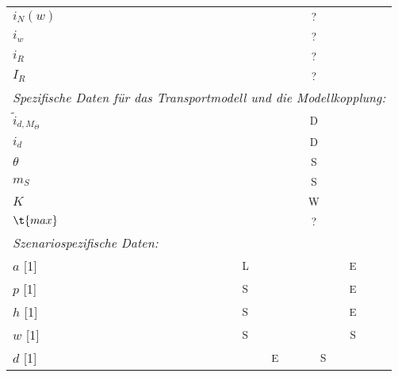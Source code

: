 \begin{longtable}{p{4cm} |p{} |p{} |p{} }
    $i_N(w)$ &\multicolumn{3}{c}{ \textsuperscript{?}}\\
    $i_w$ &\multicolumn{3}{c}{ \textsuperscript{?}}\\
    $i_R$ &\multicolumn{3}{c}{ \textsuperscript{?}}\\
    $I_R$ &\multicolumn{3}{c}{ \textsuperscript{?}}\\
    \multicolumn{4}{l}{\textit{Spezifische Daten für das Transportmodell und
        die Modellkopplung:}}\\
    $\tilde{i}_{d, M_\Theta}$ &\multicolumn{3}{c}{ \textsuperscript{D}}\\
    $i_d$ &\multicolumn{3}{c}{ \textsuperscript{D}}\\
    $\theta$ &\multicolumn{3}{c}{ \textsuperscript{S}}\\
    $m_S$ &\multicolumn{3}{c}{ \textsuperscript{S}}\\
    $K$ &\multicolumn{3}{c}{ \textsuperscript{W}}\\
    $\t{max}$ &\multicolumn{3}{c}{ \textsuperscript{?}}\\
    \multicolumn{4}{l}{\textit{Szenariospezifische Daten:}}\\
    $a$ [1] &\textsuperscript{L} &\multicolumn{2}{c}{\textsuperscript{E}}\\
    $p$ [1] &\textsuperscript{S} &\multicolumn{2}{c}{\textsuperscript{E}}\\
    $h$ [1] &\textsuperscript{S} &\multicolumn{2}{c}{\textsuperscript{E}}\\
    $w$ [1] &\textsuperscript{S} &\multicolumn{2}{c}{\textsuperscript{S}}\\
    $d$ [1] &\multicolumn{2}{c}{\textsuperscript{E}}&\textsuperscript{S} 
\end{longtable}
